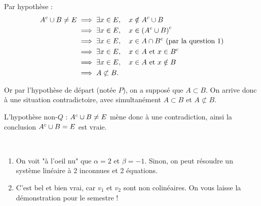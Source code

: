 \begin{exercice}
\begin{enumerate}
        Par hypothèse :
        \begin{align*}
            {A}^c \cup B \neq E
            &\implies \exists x\in E,\quad x\notin {A}^c \cup B\\
            &\implies \exists x\in E,\quad x\in {({A}^c \cup B)}^c\\
            &\implies \exists x\in E,\quad x\in A \cap {B}^c \text{ (par la question 1)}\\
            &\implies \exists x\in E,\quad x\in A \text{ et } x\in {B}^c\\
            &\implies \exists x\in E,\quad x\in A \text{ et } x\notin B\\
            &\implies A \not \subset B.
        \end{align*}

        Or par l'hypothèse de départ (notée $P$), on a supposé que $A \subset B$. On arrive donc à une situation contradictoire, avec simultanément $A \subset B$ et $A \not \subset B$.

        L'hypothèse $\text{non-}Q$ : ${A}^c \cup B \neq E$ mène donc à une contradiction, ainsi la conclusion ${A}^c \cup B = E$ est vraie. \\
    \end{enumerate}
\end{exercice}

\begin{exercice}
\,
    \begin{enumerate}
        \item On voit "à l'oeil nu" que $\alpha=2$ et $\beta=-1$. Sinon, on peut résoudre un système linéaire à 2 inconnues et 2 équations.

        \item C'est bel et bien vrai, car $v_1$ et $v_2$ sont non colinéaires. On vous laisse la démonstration pour le semestre !
    \end{enumerate}
\end{exercice}